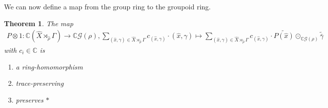 \documentclass[12pt,a4paper]{scrartcl}
\theoremstyle{plain}
\newtheorem{Theorem}{Theorem}[section]
\theoremstyle{definition}
\numberwithin{equation}{section}
\newcommand{\C}{\mathbb{C}} %
\newcommand{\2}{\mathbb{Z} / 2 \mathbb{Z}}
\newcommand{\G}{\mathcal{G}}
\newcommand{\1}{\bar{1}}
\newcommand{\0}{\bar{0}}
\begin{document}
We can now define a map from the group ring to the groupoid ring. 
\begin{Theorem}\label{map_pantryagin}
	The map 
	\begin{align*}
		P \otimes 1\colon\C(\hat{X} \rtimes_{\hat{\rho}} \Gamma) \to \C\G(\rho), 
		\sum_{(\hat{x}, \gamma) \in \hat{X} \rtimes_{\hat{\rho}} \Gamma}
		 c_{(\hat{x}, \gamma)} \cdot (\hat{x}, \gamma) \mapsto 
		 \sum_{(\hat{x}, \gamma) \in \hat{X} \rtimes_{\hat{\rho}} \Gamma} 
		 c_{(\hat{x}, \gamma)} \cdot \widetilde{P(\hat{x})} \odot_{\C\G(\rho)} \widetilde{\bar{\gamma}} 
	\end{align*}
	 with $c_i \in \C$ is
	\begin{enumerate}
		\item a ring-homomorphism
		\item trace-preserving
		\item preserves $*$
	\end{enumerate}
\end{Theorem}
\end{document}
